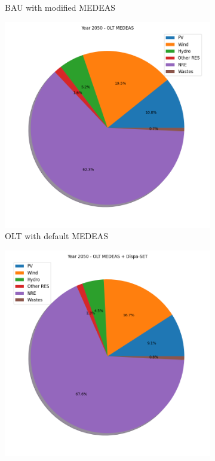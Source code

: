 \begin{figure}[h]
\begin{subfigure}{0.34\textwidth}
        \caption{BAU with modified MEDEAS}
        \label{fig:electricity-mix-BAU-dispa}
    \end{subfigure}
    \hfill
    \begin{subfigure}{0.34\textwidth}
        \includegraphics[width=\textwidth]{resources/images/electricity-mix-OLT-default.png}
        \caption{OLT with default MEDEAS}
        \label{fig:electricity-mix-OLT-def}
    \end{subfigure}
    \begin{subfigure}{0.34\textwidth}
        \includegraphics[width=\textwidth]{resources/images/electricity-mix-OLT-dispa.png}

\end{subfigure}
\end{figure}
